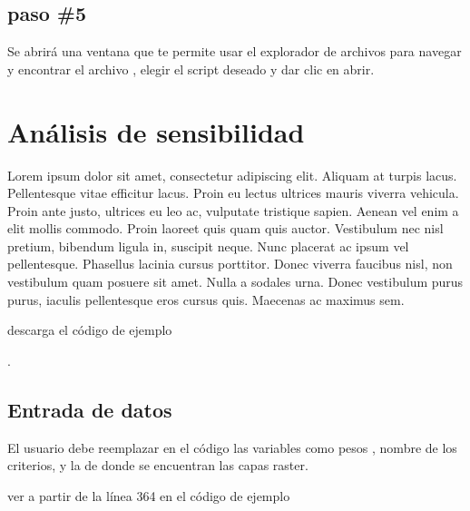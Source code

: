 \documentclass[letterpaper,10pt,spanish]{sphinxmanual}
\begin{document}
\section{paso \#5}
\label{\detokenize{ejecucion:paso-5}}
Se abrirá una ventana que te permite usar el explorador de archivos
para navegar y encontrar el archivo , elegir el script deseado y
dar clic en abrir.

\noindent{}


\chapter{Análisis de sensibilidad}
\label{\detokenize{analisis:analisis-de-sensibilidad}}\label{\detokenize{analisis::doc}}
Lorem ipsum dolor sit amet, consectetur adipiscing elit.
Aliquam at turpis lacus. Pellentesque vitae efficitur lacus.
Proin eu lectus ultrices mauris viverra vehicula. Proin ante justo,
ultrices eu leo ac, vulputate tristique sapien. Aenean vel enim a elit mollis commodo.
Proin laoreet quis quam quis auctor. Vestibulum nec nisl pretium, bibendum ligula in,
suscipit neque. Nunc placerat ac ipsum vel pellentesque. Phasellus lacinia cursus porttitor.
Donec viverra faucibus nisl, non vestibulum quam posuere sit amet. Nulla a sodales urna.
Donec vestibulum purus purus, iaculis pellentesque eros cursus quis. Maecenas ac maximus sem.

descarga el código de ejemplo

.


\section{Entrada de datos}
\label{\detokenize{analisis:entrada-de-datos}}
El usuario debe reemplazar en el código las variables como pesos ,
nombre de los criterios, y  la  de donde se encuentran las capas
raster.

ver a partir de la línea 364 en el código de ejemplo
\end{document}
